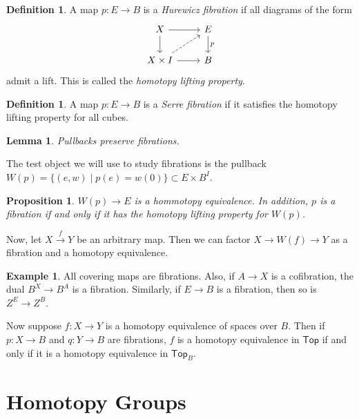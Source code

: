 \documentclass[leqno, openany]{memoir}
\newtheorem{prop}[thm]{Proposition}
\newtheorem{lem}[thm]{Lemma}
\theoremstyle{definition}
\newtheorem{defn}[thm]{Definition}
\newtheorem{exm}[thm]{Example}
\theoremstyle{remark}
\theoremstyle{plain}
\theoremstyle{definition}
\theoremstyle{remark}
\newcommand{\ms}[1]{\mathsf{#1}}
\begin{document}
\begin{defn}
    A map $p \colon E \to B$ is a \textit{Hurewicz fibration} if all diagrams of the form
    \begin{equation}
    \begin{tikzcd}
        X \arrow{r} \arrow{d} & E \arrow{d}{p} \\
        X \times I \arrow{r} \arrow[dashrightarrow]{ur} & B
    \end{tikzcd}
    \end{equation}
    admit a lift. This is called the \textit{homotopy lifting property}.  
\end{defn}

\begin{defn}
    A map $p \colon E \to B$ is a \textit{Serre fibration} if it satisfies the homotopy lifting property for all cubes. 
\end{defn}

\begin{lem}
    Pullbacks preserve fibrations.
\end{lem}

The test object we will use to study fibrations is the pullback $W(p) = \{ (e,w) \mid p(e) = w(0) \} \subset E \times B^I$.

\begin{prop}
    $W(p) \to E$ is a hommotopy equivalence. In addition, $p$ is a fibration if and only if it has the homotopy lifting property for $W(p)$.
\end{prop}

Now, let $X \xrightarrow{f} Y$ be an arbitrary map. Then we can factor $X \to W(f) \to Y$ as a fibration and a homotopy equivalence.

\begin{exm}
    All covering maps are fibrations. Also, if $A \to X$ is a cofibration, the dual $B^X \to B^A$ is a fibration. Similarly, if $E \to B$ is a fibration, then so is $Z^E \to Z^B$.
\end{exm}

Now suppose $f \colon X \to Y$ is a homotopy equivalence of spaces over $B$. Then if $p \colon X \to B$ and $q \colon Y \to B$ are fibrations, $f$ is a homotopy equivalence in $\ms{Top}$ if and only if it is a homotopy equivalence in $\ms{Top}_B$.

\section{Homotopy Groups}%
\label{sec:homotopy_groups}
\end{document}
